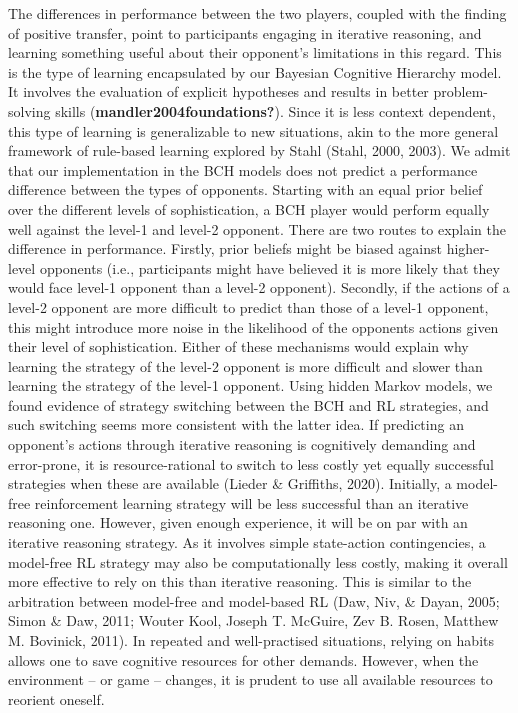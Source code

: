 \documentclass[
  english,
  man,floatsintext]{apa6}
\begin{document}
The differences in performance between the two players, coupled with the finding of positive transfer, point to participants engaging in iterative reasoning, and learning something useful about their opponent's limitations in this regard. This is the type of learning encapsulated by our Bayesian Cognitive Hierarchy model. It involves the evaluation of explicit hypotheses and results in better problem-solving skills (\textbf{mandler2004foundations?}). Since it is less context dependent, this type of learning is generalizable to new situations, akin to the more general framework of rule-based learning explored by Stahl (Stahl, 2000, 2003).
We admit that our implementation in the BCH models does not predict a performance difference between the types of opponents. Starting with an equal prior belief over the different levels of sophistication, a BCH player would perform equally well against the level-1 and level-2 opponent. There are two routes to explain the difference in performance. Firstly, prior beliefs might be biased against higher-level opponents (i.e., participants might have believed it is more likely that they would face level-1 opponent than a level-2 opponent). Secondly, if the actions of a level-2 opponent are more difficult to predict than those of a level-1 opponent, this might introduce more noise in the likelihood of the opponents actions given their level of sophistication. Either of these mechanisms would explain why learning the strategy of the level-2 opponent is more difficult and slower than learning the strategy of the level-1 opponent. Using hidden Markov models, we found evidence of strategy switching between the BCH and RL strategies, and such switching seems more consistent with the latter idea. If predicting an opponent's actions through iterative reasoning is cognitively demanding and error-prone, it is resource-rational to switch to less costly yet equally successful strategies when these are available (Lieder \& Griffiths, 2020). Initially, a model-free reinforcement learning strategy will be less successful than an iterative reasoning one. However, given enough experience, it will be on par with an iterative reasoning strategy. As it involves simple state-action contingencies, a model-free RL strategy may also be computationally less costly, making it overall more effective to rely on this than iterative reasoning. This is similar to the arbitration between model-free and model-based RL (Daw, Niv, \& Dayan, 2005; Simon \& Daw, 2011; Wouter Kool, Joseph T. McGuire, Zev B. Rosen, Matthew M. Bovinick, 2011). In repeated and well-practised situations, relying on habits allows one to save cognitive resources for other demands. However, when the environment -- or game -- changes, it is prudent to use all available resources to reorient oneself.
\end{document}
